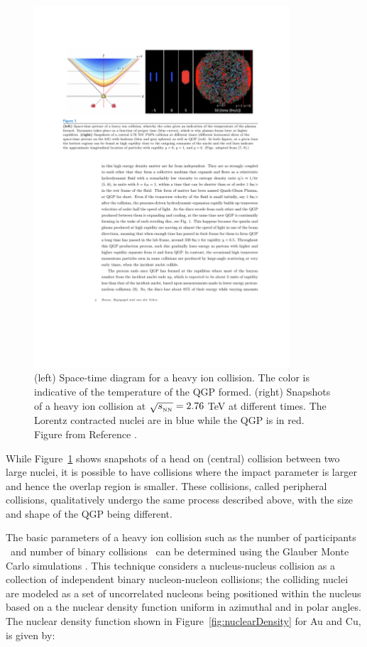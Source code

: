 \begin{figure}[htbp]
\begin{center}
\includegraphics[width=0.85\textwidth]{figures/theory/qgp_formation}
\caption{(left) Space-time diagram for a heavy ion collision. The color is indicative of the temperature of the QGP formed. (right) Snapshots of a heavy ion collision at $\mbox{$\sqrt{s_{_\text{NN}}}$} = 2.76$ TeV at different times. The Lorentz contracted nuclei are in blue while the QGP is in red. Figure from Reference \cite{Busza:2018rrf}.  }
\label{fig:qgp_form}
\end{center}
\end{figure}

While Figure~\ref{fig:qgp_form} shows snapshots of a head on (central) collision between two large nuclei, it is possible to have collisions where the impact parameter is larger and hence the overlap region is smaller. These collisions, called peripheral collisions, qualitatively undergo the same process described above, with the size and shape of the QGP being different.

The basic parameters of a heavy ion collision such as the number of participants \Npart\ and number of binary collisions \Ncoll\ can be determined using the Glauber Monte Carlo simulations \cite{glauberArticle, glauberMisc}. This technique considers a nucleus-nucleus collision as a collection of independent binary nucleon-nucleon collisions; the colliding nuclei are modeled as a set of uncorrelated nucleons being positioned within the nucleus based on a the nuclear density function uniform in azimuthal and in polar angles. The nuclear density function shown in Figure~\ref{fig:nuclearDensity} for Au and Cu, is given by:

